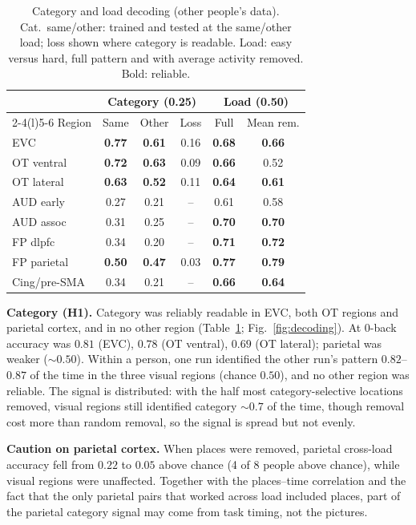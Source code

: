 \documentclass[conference]{IEEEtran}
\begin{document}
\begin{table}[!tb]
\caption{Category and load decoding (other people's data). Cat.\ same/other: trained and tested at the same/other load; loss shown where category is readable. Load: easy versus hard, full pattern and with average activity removed. Bold: reliable.}
\label{tab:cat}
\centering\footnotesize
\setlength{\tabcolsep}{3.5pt}
\begin{tabular}{@{}lccccc@{}}
\toprule
 & \multicolumn{3}{c}{Category (0.25)} & \multicolumn{2}{c}{Load (0.50)}\\
\cmidrule(lr){2-4}\cmidrule(l){5-6}
Region & Same & Other & Loss & Full & Mean rem.\\
\midrule
EVC & \textbf{0.77} & \textbf{0.61} & 0.16 & \textbf{0.68} & \textbf{0.66}\\
OT ventral & \textbf{0.72} & \textbf{0.63} & 0.09 & \textbf{0.66} & 0.52\\
OT lateral & \textbf{0.63} & \textbf{0.52} & 0.11 & \textbf{0.64} & \textbf{0.61}\\
AUD early & 0.27 & 0.21 & -- & 0.61 & 0.58\\
AUD assoc & 0.31 & 0.25 & -- & \textbf{0.70} & \textbf{0.70}\\
FP dlpfc & 0.34 & 0.20 & -- & \textbf{0.71} & \textbf{0.72}\\
FP parietal & \textbf{0.50} & \textbf{0.47} & 0.03 & \textbf{0.77} & \textbf{0.79}\\
Cing/pre-SMA & 0.34 & 0.21 & -- & \textbf{0.66} & \textbf{0.64}\\
\bottomrule
\end{tabular}
\end{table}

\textbf{Category (H1).} Category was reliably readable in EVC, both OT regions and parietal cortex, and in no other region (Table~\ref{tab:cat}; Fig.~\ref{fig:decoding}). At 0-back accuracy was $0.81$ (EVC), $0.78$ (OT ventral), $0.69$ (OT lateral); parietal was weaker (${\sim}0.50$). Within a person, one run identified the other run's pattern $0.82$--$0.87$ of the time in the three visual regions (chance $0.50$), and no other region was reliable. The signal is distributed: with the half most category-selective locations removed, visual regions still identified category ${\sim}0.7$ of the time, though removal cost more than random removal, so the signal is spread but not evenly.

\textbf{Caution on parietal cortex.} When places were removed, parietal cross-load accuracy fell from $0.22$ to $0.05$ above chance (4 of 8 people above chance), while visual regions were unaffected. Together with the places--time correlation and the fact that the only parietal pairs that worked across load included places, part of the parietal category signal may come from task timing, not the pictures.
\end{document}
